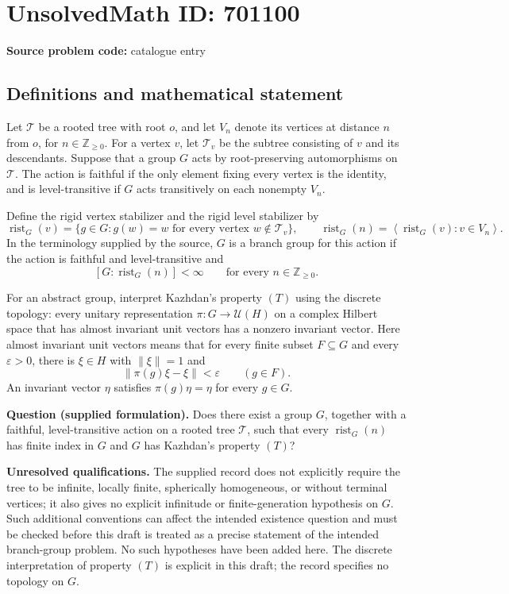 \documentclass[11pt]{article}
\newcommand{\Z}{\mathbb{Z}}
\begin{document}
\section*{UnsolvedMath ID: 701100}
\textbf{Source problem code:} catalogue entry
\subsection{Definitions and mathematical statement}
Let \(\mathcal T\) be a rooted tree with root \(o\), and let \(V_n\) denote its vertices at distance \(n\) from \(o\), for \(n\in\Z_{\geq 0}\). For a vertex \(v\), let \(\mathcal T_v\) be the subtree consisting of \(v\) and its descendants. Suppose that a group \(G\) acts by root-preserving automorphisms on \(\mathcal T\). The action is faithful if the only element fixing every vertex is the identity, and is level-transitive if \(G\) acts transitively on each nonempty \(V_n\).

Define the rigid vertex stabilizer and the rigid level stabilizer by
\[
\operatorname{rist}_G(v)=\{g\in G: g(w)=w\text{ for every vertex }w\notin\mathcal T_v\},
\qquad
\operatorname{rist}_G(n)=\left\langle\operatorname{rist}_G(v):v\in V_n\right\rangle.
\]
In the terminology supplied by the source, \(G\) is a branch group for this action if the action is faithful and level-transitive and
\[
[G:\operatorname{rist}_G(n)]<\infty
\qquad\text{for every }n\in\Z_{\geq 0}.
\]

For an abstract group, interpret Kazhdan's property \((T)\) using the discrete topology: every unitary representation \(\pi:G\to\mathcal U(H)\) on a complex Hilbert space that has almost invariant unit vectors has a nonzero invariant vector. Here almost invariant unit vectors means that for every finite subset \(F\subseteq G\) and every \(\varepsilon>0\), there is \(\xi\in H\) with \(\|\xi\|=1\) and
\[
\|\pi(g)\xi-\xi\|<\varepsilon\qquad(g\in F).
\]
An invariant vector \(\eta\) satisfies \(\pi(g)\eta=\eta\) for every \(g\in G\).

\textbf{Question (supplied formulation).} Does there exist a group \(G\), together with a faithful, level-transitive action on a rooted tree \(\mathcal T\), such that every \(\operatorname{rist}_G(n)\) has finite index in \(G\) and \(G\) has Kazhdan's property \((T)\)?

\textbf{Unresolved qualifications.} The supplied record does not explicitly require the tree to be infinite, locally finite, spherically homogeneous, or without terminal vertices; it also gives no explicit infinitude or finite-generation hypothesis on \(G\). Such additional conventions can affect the intended existence question and must be checked before this draft is treated as a precise statement of the intended branch-group problem. No such hypotheses have been added here. The discrete interpretation of property \((T)\) is explicit in this draft; the record specifies no topology on \(G\).
\end{document}
